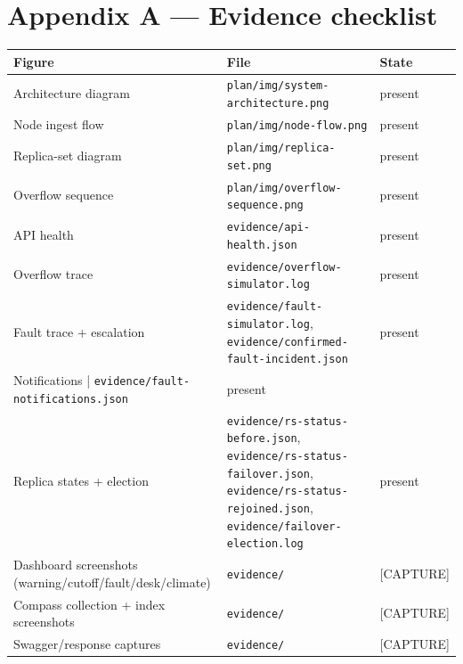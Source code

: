 \documentclass[11pt,a4paper]{article}
\begin{document}
\section*{Appendix A --- Evidence checklist}
\begin{center}
\small
\begin{tabularx}{\textwidth}{@{}lXl@{}}
\toprule
Figure & File & State \\
\midrule
Architecture diagram & \texttt{plan/img/system-architecture.png} & present \\
Node ingest flow & \texttt{plan/img/node-flow.png} & present \\
Replica-set diagram & \texttt{plan/img/replica-set.png} & present \\
Overflow sequence & \texttt{plan/img/overflow-sequence.png} & present \\
API health & \texttt{evidence/api-health.json} & present \\
Overflow trace & \texttt{evidence/overflow-simulator.log} & present \\
Fault trace + escalation & \texttt{evidence/fault-simulator.log}, \texttt{evidence/confirmed-fault-incident.json} & present \\
Notifications | \texttt{evidence/fault-notifications.json} & present \\
Replica states + election & \texttt{evidence/rs-status-before.json}, \texttt{evidence/rs-status-failover.json}, \texttt{evidence/rs-status-rejoined.json}, \texttt{evidence/failover-election.log} & present \\
Dashboard screenshots (warning/cutoff/fault/desk/climate) & \texttt{evidence/} & [CAPTURE] \\
Compass collection + index screenshots & \texttt{evidence/} & [CAPTURE] \\
Swagger/response captures & \texttt{evidence/} & [CAPTURE] \\
\bottomrule
\end{tabularx}
\end{center}
\end{document}
